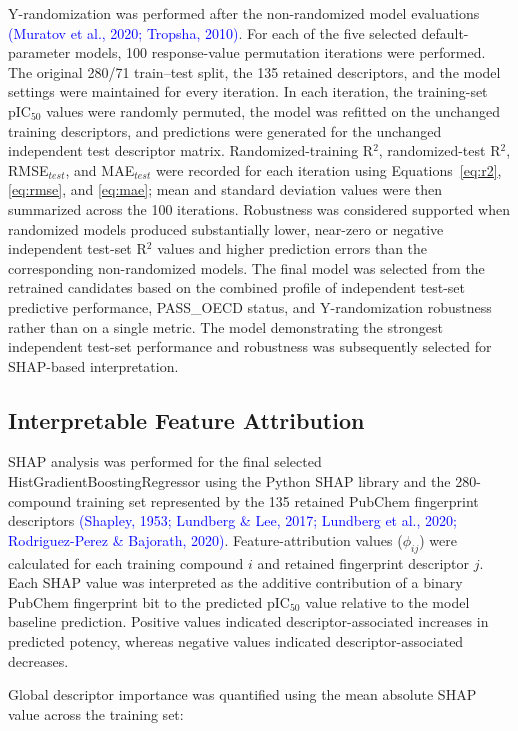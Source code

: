 \documentclass[11pt]{article}
\begin{document}
Y-randomization was performed after the non-randomized model evaluations \textcolor{blue}{(Muratov et al., 2020; Tropsha, 2010)}. For each of the five selected default-parameter models, 100 response-value permutation iterations were performed. The original 280/71 train--test split, the 135 retained descriptors, and the model settings were maintained for every iteration. In each iteration, the training-set pIC$_{50}$ values were randomly permuted, the model was refitted on the unchanged training descriptors, and predictions were generated for the unchanged independent test descriptor matrix. Randomized-training R$^2$, randomized-test R$^2$, RMSE$_{test}$, and MAE$_{test}$ were recorded for each iteration using Equations~\ref{eq:r2}, \ref{eq:rmse}, and \ref{eq:mae}; mean and standard deviation values were then summarized across the 100 iterations. Robustness was considered supported when randomized models produced substantially lower, near-zero or negative independent test-set R$^2$ values and higher prediction errors than the corresponding non-randomized models. The final model was selected from the retrained candidates based on the combined profile of independent test-set predictive performance, PASS\_OECD status, and Y-randomization robustness rather than on a single metric. The model demonstrating the strongest independent test-set performance and robustness was subsequently selected for SHAP-based interpretation.

\subsection{Interpretable Feature Attribution}

SHAP analysis was performed for the final selected HistGradientBoostingRegressor using the Python SHAP library and the 280-compound training set represented by the 135 retained PubChem fingerprint descriptors \textcolor{blue}{(Shapley, 1953; Lundberg \& Lee, 2017; Lundberg et al., 2020; Rodriguez-Perez \& Bajorath, 2020)}. Feature-attribution values ($\phi_{ij}$) were calculated for each training compound $i$ and retained fingerprint descriptor $j$. Each SHAP value was interpreted as the additive contribution of a binary PubChem fingerprint bit to the predicted pIC$_{50}$ value relative to the model baseline prediction. Positive values indicated descriptor-associated increases in predicted potency, whereas negative values indicated descriptor-associated decreases.

Global descriptor importance was quantified using the mean absolute SHAP value across the training set:
\end{document}
